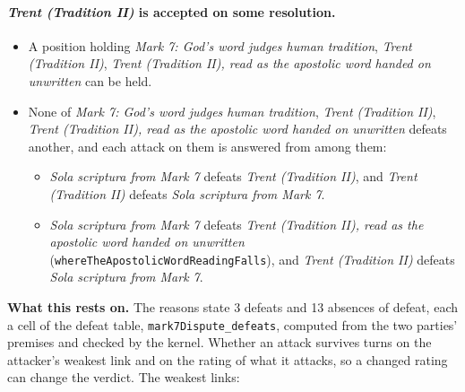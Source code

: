 \documentclass[11pt]{article}
\begin{document}
\paragraph{\emph{Trent (Tradition II)} is accepted on some resolution.}
\begin{itemize}
\item A position holding \emph{Mark 7: God's word judges human tradition}, \emph{Trent (Tradition II)}, \emph{Trent (Tradition II), read as the apostolic word handed on unwritten} can be held.
\item None of \emph{Mark 7: God's word judges human tradition}, \emph{Trent (Tradition II)}, \emph{Trent (Tradition II), read as the apostolic word handed on unwritten} defeats another, and each attack on them is answered from among them:
\begin{itemize}
\item \emph{Sola scriptura from Mark 7} defeats \emph{Trent (Tradition II)}, and \emph{Trent (Tradition II)} defeats \emph{Sola scriptura from Mark 7}.
\item \emph{Sola scriptura from Mark 7} defeats \emph{Trent (Tradition II), read as the apostolic word handed on unwritten} (\texttt{where\allowbreak{}The\allowbreak{}Apostolic\allowbreak{}Word\allowbreak{}Reading\allowbreak{}Falls}), and \emph{Trent (Tradition II)} defeats \emph{Sola scriptura from Mark 7}.
\end{itemize}
\end{itemize}
\par\noindent\textbf{What this rests on.} The reasons state 3 defeats and 13 absences of defeat, each a cell of the defeat table, \texttt{mark7\allowbreak{}Dispute\_\allowbreak{}defeats}, computed from the two parties' premises and checked by the kernel. Whether an attack survives turns on the attacker's weakest link and on the rating of what it attacks, so a changed rating can change the verdict. The weakest links:
\end{document}
